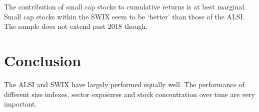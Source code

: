 \documentclass[11pt,preprint, authoryear]{elsarticle}
\numberwithin{equation}{section}
\numberwithin{figure}{section}
\numberwithin{table}{section}
\begin{document}
The contribution of small cap stocks to cumulative returns is at best
marginal. Small cap stocks within the SWIX seem to be `better' than
those of the ALSI. The sample does not extend past 2018 though.

\hypertarget{conclusion}{%
\section{Conclusion}\label{conclusion}}

The ALSI and SWIX have largely performed equally well. The performance
of different size indexes, sector exposures and stock concentration over
time are very important.


\end{document}
